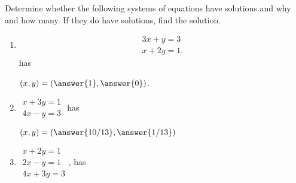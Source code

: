 \documentclass{ximera}
\author{Zack Reed}
\begin{document}
\begin{problem}

Determine whether the following systems of equations have solutions and why and how many. If they do have solutions, find the solution.

\begin{enumerate}

\item  \begin{equation*}
    \begin{array}{c}
      3x+y=3 \\
      x+2y=1.
    \end{array}
  \end{equation*} has 

  \begin{selectAll}
  \end{selectAll}

  \begin{problem}
    $(x,y) = (\answer{1},\answer{0})$.
    \end{problem}

\item $
  \begin{array}{c}
    x+3y=1 \\
    4x-y=3
  \end{array}
  $ has

    \begin{selectAll}
    \end{selectAll}
  
  \begin{problem}
  
    $(x,y) = (\answer{10/13},\answer{1/13})$

  \end{problem}

\item $
\begin{array}{c}
    x+2y=1 \\
    2x-y=1 \\
    4x+3y=3
  \end{array}
  $, has
  
  \begin{selectAll}
    \end{selectAll}
  

\end{enumerate}
\end{problem}
\end{document}
